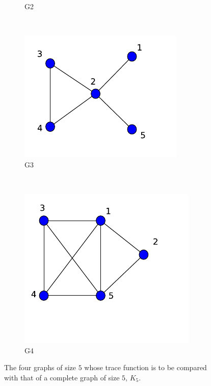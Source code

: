 \documentclass[10pt,a4paper]{article}
\begin{document}
\begin{figure}[H]
\begin{subfigure}[b]{0.35\textwidth}
	  		\caption{G2}
	  		\label{G2}
	  	\end{subfigure} \\
	  	\begin{subfigure}[b]{0.35\textwidth}
	  		\includegraphics[width= \textwidth]{images/G3-khop.pdf}
	  		\caption{G3}
	  		\label{G3}
	  	\end{subfigure}~
	  	\begin{subfigure}[b]{0.35\textwidth}
	  		\includegraphics[width= \textwidth]{images/G4-khop.pdf}
	  		\caption{G4}
	  		\label{G4}
	  	\end{subfigure}
	  	\caption{The four graphs of size $5$ whose trace function is to be compared with that of a complete graph of size $5$, $K_5$.}
	  	\label{}
	  \end{figure}
 
\end{document}
